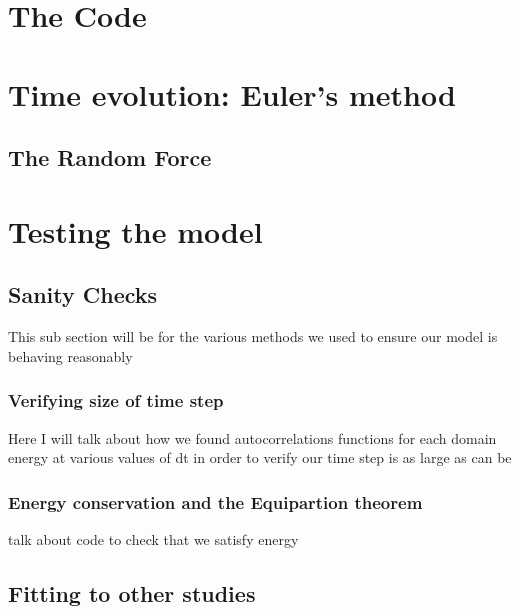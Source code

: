 	
\section{The Code}
	\section{Time evolution: Euler's method}
	\subsection{The Random Force}


\section{Testing the model} 
\subsection{Sanity Checks}
This sub section will be for the various methods we used to ensure our model is behaving reasonably 
\subsubsection{Verifying size of time step} 
Here I will talk about how we found autocorrelations functions for each domain energy at various values of dt in order to verify our time step is as large as can be
\subsubsection{Energy conservation and the Equipartion theorem} 
talk about code to check that we satisfy energy 
\subsection{Fitting to other studies} 	